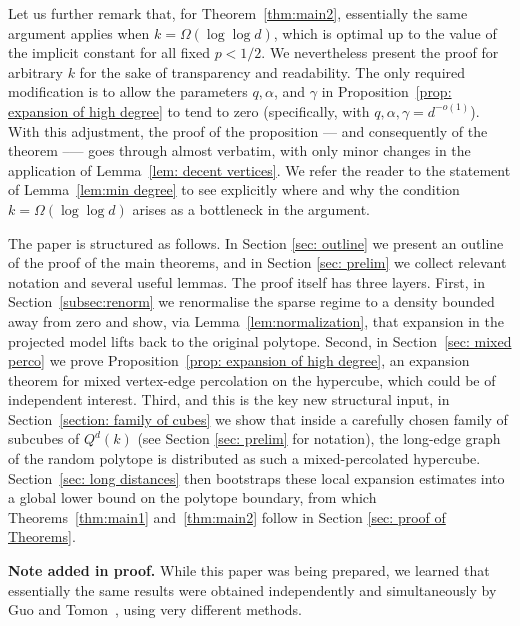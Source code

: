 \documentclass{article}
\theoremstyle{definition}
\begin{document}
Let us further remark that, for Theorem~\ref{thm:main2}, essentially the same argument applies when $k=\Omega(\log \log d)$, which is optimal up to the value of the implicit constant for all fixed $p<1/2$. We nevertheless present the proof for arbitrary $k$ for the sake of transparency and readability. The only required modification is to allow the parameters $q,\alpha$, and $\gamma$ in Proposition~\ref{prop: expansion of high degree} to tend to zero (specifically, with $q,\alpha,\gamma=d^{-o(1)}$). With this adjustment, the proof of the proposition --- and consequently of the theorem --— goes through almost verbatim, with only minor changes in the application of Lemma~\ref{lem: decent vertices}. We refer the reader to the statement of Lemma~\ref{lem:min degree} to see explicitly where and why the condition $k=\Omega(\log \log d)$ arises as a bottleneck in the argument.


The paper is structured as follows. In Section \ref{sec: outline} we present an outline of the proof of the main theorems, and in Section \ref{sec: prelim} we collect relevant notation and several useful lemmas. The proof itself has three layers. First, in Section~\ref{subsec:renorm} we renormalise the sparse regime to a density bounded away from zero and show, via Lemma~\ref{lem:normalization}, that expansion in the projected model lifts back to the original polytope. Second, in Section~\ref{sec: mixed perco} we prove Proposition~\ref{prop: expansion of high degree}, an expansion theorem for mixed vertex-edge percolation on the hypercube, which could be of independent interest. Third, and this is the key new structural input, in Section~\ref{section: family of cubes} we show that inside a carefully chosen family of subcubes of $Q^d(k)$ (see Section \ref{sec: prelim} for notation), the long-edge graph of the random polytope is distributed as such a mixed-percolated hypercube. Section~\ref{sec: long distances} then bootstraps these local expansion estimates into a global lower bound on the polytope boundary, from which Theorems~\ref{thm:main1} and~\ref{thm:main2} follow in Section \ref{sec: proof of Theorems}.

\bigskip
\noindent
{\bf Note added in proof.} While this paper was being prepared, we
learned that essentially the same results were obtained independently and
simultaneously by Guo and Tomon~\cite{GT26}, using very different
methods.
\end{document}
